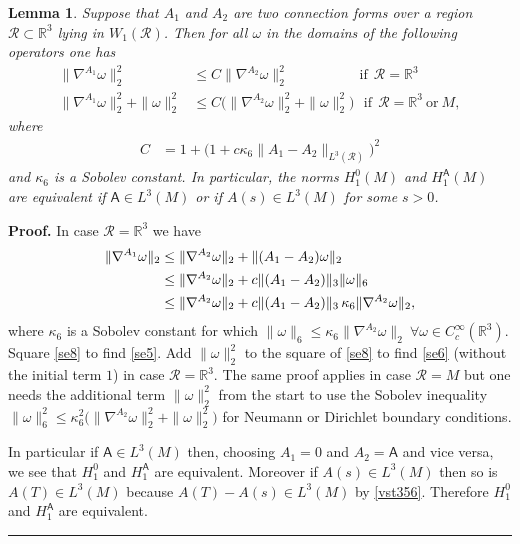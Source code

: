 \documentclass[12pt]{article}
\newtheorem{lemma}[theorem]{Lemma}
\newenvironment{proof}[1][Proof]{\textbf{#1.} }{\ \rule{0.5em}{0.5em}}
\def \({\Big(}
\def \){\Big)}
\def \R{\mathbb R}
\def \As{\mathsf{A}}
\def \w{\omega}
\def \n{\nabla}
\def \eref{\eqref}
\numberwithin{equation}{section}
\begin{document}
     
     \begin{lemma} \label{lemeqSob} Suppose that $A_1$ and $A_2$ are two connection forms over
      a region ${\mathcal R}\subset \R^3$  lying in $W_1(\mathcal R)$.
      Then for all $\w$ in the  domains of the following operators one has
     \begin{align}
     \|\n^{A_1} \w\|_2^2 &\le 
     C\| \n^{A_2} \w \|_2^2 \qquad\qquad\ \ \ \ \, \text{if} \ \ \mathcal R = \R^3    \label{se5}\\
      \|\n^{A_1} \w\|_2^2 +\| \w\|_2^2  &\le  
     C\Big( \| \n^{A_2} \w \|_2^2 +\|\w\|_2^2\Big)\ \ \ \text{if} \ \ \mathcal R = \R^3\ \text{or}\ M,  \label{se6}
     \end{align}     
     where 
     \begin{align}
     C &= 1 + \(1 +c\kappa_6\|A_1 - A_2\|_{L^3(\mathcal R)}\)^2          \label{se7}
     \end{align}
     and $\kappa_6$ is a Sobolev constant. In particular, the norms $H_1^0(M)$ and $H_1^\As(M)$ are 
     equivalent if  $\As \in L^3(M)$ or if $A(s) \in L^3(M)$ for some $s >0$.
          \end{lemma}
                  \begin{proof} In case $\mathcal R = \R^3$ we have
           \begin{align}
           \|\n^{A_1} \w\|_2  &\le \|\n^{A_2} \w\|_2  +\|(A_1 - A_2)\w\|_2 \notag   \\
           &\le   \|\n^{A_2} \w\|_2  + c\|(A_1 - A_2)\|_3 \|\w\|_6    \notag   \\
           &\le   \|\n^{A_2} \w\|_2  + c\|(A_1 - A_2)\|_3\, \kappa_6 \| \n^{A_2} \w\|_2,       \label{se8}
           \end{align}
           where $\kappa_6$ is a Sobolev constant for which 
           $\|\w\|_6 \le \kappa_6 \|\n^{A_2} \w\|_2\ \forall \w \in C_c^\infty(\R^3)$.
           Square \eref{se8} to find \eref{se5}. Add $\|\w\|_2^2$ to the square of  \eref{se8} 
            to find \eref{se6} (without the initial term $1$) in case $\mathcal R = \R^3$. 
            The same proof applies in case $\mathcal R = M$
            but one needs the additional term $\|\w\|_2^2$ from the start to use the  Sobolev inequality
            $\|\w\|_6^2 \le \kappa_6^2 \Big( \|\n^{A_2} \w\|_2^2 + \| \w\|_2^2\Big)$ for Neumann
            or Dirichlet boundary conditions.
            
            In particular if $\As \in L^3(M)$ then, choosing $A_1= 0$ and $A_2= \As$ and vice versa,
            we see that $H_1^0$ and $H_1^\As$ are equivalent.     
                   Moreover if $A(s) \in L^3(M)$     then so is $A(T) \in L^3(M)$ because $A(T) - A(s) \in L^3(M)$
                   by \eref{vst356}.  Therefore $H_1^0$ and $H_1^\As$ are equivalent.                    
   \end{proof}
 
\end{document}
